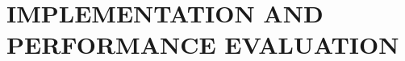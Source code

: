 \documentclass[12 pt, oneside]{book}
\begin{document}
\chapter{IMPLEMENTATION AND PERFORMANCE EVALUATION}








\end{document}
